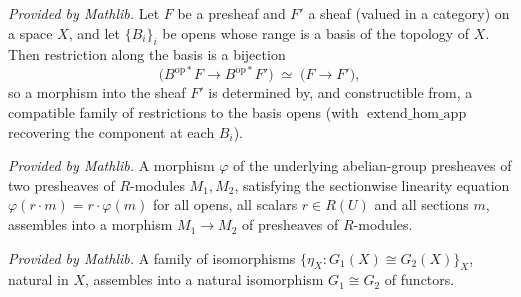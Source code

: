 \begin{lemma}
  \label{lem:restrictHomEquivHom_mathlib}
  \mathlibok
  \textit{Provided by Mathlib.}
  Let \(F\) be a presheaf and \(F'\) a sheaf (valued in a category) on a space \(X\),
  and let \(\{B_i\}_{i}\) be opens whose range is a basis of the topology of \(X\).
  Then restriction along the basis is a bijection
  \[
    \bigl(B^{\mathrm{op}*}F \longrightarrow B^{\mathrm{op}*}F'\bigr)
    \;\simeq\;
    \bigl(F \longrightarrow F'\bigr),
  \]
  so a morphism into the sheaf \(F'\) is determined by, and constructible from, a
  compatible family of restrictions to the basis opens (with
  \(\operatorname{extend\_hom\_app}\) recovering the component at each \(B_i\)).
\end{lemma}

\begin{lemma}
  \label{lem:presheafOfModules_homMk_mathlib}
  \mathlibok
  \textit{Provided by Mathlib.}
  A morphism \(\varphi\) of the underlying abelian-group presheaves of two presheaves
  of \(R\)-modules \(M_1, M_2\), satisfying the sectionwise linearity equation
  \(\varphi(r \cdot m) = r \cdot \varphi(m)\) for all opens, all scalars
  \(r \in R(U)\) and all sections \(m\), assembles into a morphism
  \(M_1 \to M_2\) of presheaves of \(R\)-modules.
\end{lemma}

\begin{lemma}
  \label{lem:natIso_ofComponents_mathlib}
  \mathlibok
  \textit{Provided by Mathlib.}
  A family of isomorphisms \(\{\eta_X : G_1(X) \cong G_2(X)\}_X\), natural in \(X\),
  assembles into a natural isomorphism \(G_1 \cong G_2\) of functors.
\end{lemma}

